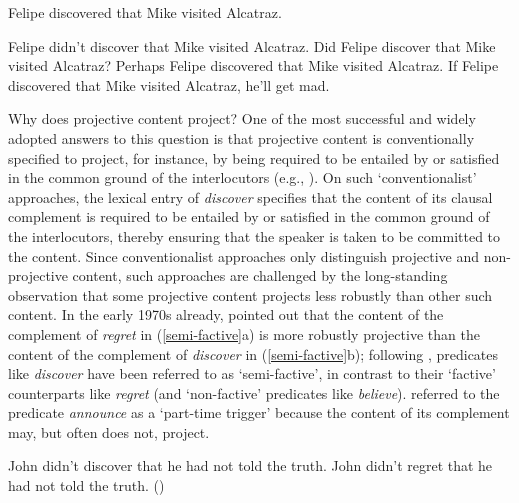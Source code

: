 \documentclass[11pt,fleqn]{article}
\newcommand{\6}{\mbox{$[\hspace*{-.6mm}[$}}
\newcommand{\9}{\mbox{$]\hspace*{-.6mm}]$}}
\begin{document}
\begin{exe}
\ex\label{eng1}  Felipe discovered that Mike visited Alcatraz.

\ex\label{eng2}
\begin{xlist} 
\ex Felipe didn't discover that Mike visited Alcatraz.
\ex Did Felipe discover that Mike visited Alcatraz?
\ex Perhaps Felipe discovered that Mike visited Alcatraz.
\ex If Felipe discovered that Mike visited Alcatraz, he'll get mad.
\end{xlist}
\end{exe}

Why does projective content project? One of the most successful and widely adopted answers to this question is that projective content is conventionally specified to project, for instance, by being required to be entailed by or satisfied in the common ground of the interlocutors (e.g., \citealt{heim83,vds92,geurts99}). On such `conventionalist' approaches, the lexical entry of {\em discover} specifies that the content of its clausal complement is required to be entailed by or satisfied in the common ground of the interlocutors, thereby ensuring that the speaker is taken to be committed to the content. Since conventionalist approaches only distinguish projective and non-projective content, such approaches are challenged by the long-standing observation that some projective content projects less robustly than other such content. In the early 1970s already, \citet{karttunen71b} pointed out that the content of the complement of {\em regret} in (\ref{semi-factive}a) is more robustly projective than the content of the complement of {\em discover} in (\ref{semi-factive}b); following \citealt{karttunen71b}, predicates like {\em discover} have been referred to as `semi-factive', in contrast to their `factive' counterparts like {\em regret} (and `non-factive' predicates like {\em believe}). \citet{schlenker10} referred to the predicate {\em announce} as a `part-time trigger' because the content of its complement may, but often does not, project.

\begin{exe}
\ex\label{semi-factive}
\begin{xlist}
\ex John didn't discover that he had not told the truth.  
\ex John didn't regret that he had not told the truth.
\hfill (\citealt[63]{karttunen71b})

\end{xlist}
\end{exe}
\end{document}
